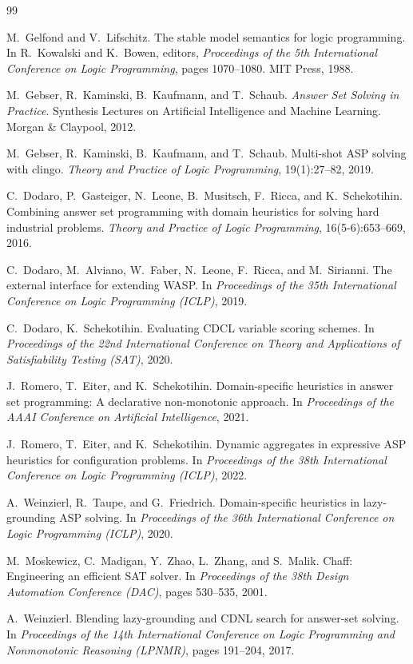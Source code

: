 \documentclass[a4paper,12pt,twoside,openright]{report}
\begin{document}
\begin{thebibliography}{99}

M.~Gelfond and V.~Lifschitz.
\newblock The stable model semantics for logic programming.
\newblock In R.~Kowalski and K.~Bowen, editors, \emph{Proceedings of the 5th International Conference on Logic Programming}, pages 1070--1080. MIT Press, 1988.

M.~Gebser, R.~Kaminski, B.~Kaufmann, and T.~Schaub.
\newblock \emph{Answer Set Solving in Practice}.
\newblock Synthesis Lectures on Artificial Intelligence and Machine Learning. Morgan \& Claypool, 2012.

M.~Gebser, R.~Kaminski, B.~Kaufmann, and T.~Schaub.
\newblock Multi-shot {ASP} solving with clingo.
\newblock \emph{Theory and Practice of Logic Programming}, 19(1):27--82, 2019.

C.~Dodaro, P.~Gasteiger, N.~Leone, B.~Musitsch, F.~Ricca, and K.~Schekotihin.
\newblock Combining answer set programming with domain heuristics for solving hard industrial problems.
\newblock \emph{Theory and Practice of Logic Programming}, 16(5-6):653--669, 2016.

C.~Dodaro, M.~Alviano, W.~Faber, N.~Leone, F.~Ricca, and M.~Sirianni.
\newblock The external interface for extending {WASP}.
\newblock In \emph{Proceedings of the 35th International Conference on Logic Programming (ICLP)}, 2019.

C.~Dodaro, K.~Schekotihin.
\newblock Evaluating {CDCL} variable scoring schemes.
\newblock In \emph{Proceedings of the 22nd International Conference on Theory and Applications of Satisfiability Testing (SAT)}, 2020.

J.~Romero, T.~Eiter, and K.~Schekotihin.
\newblock Domain-specific heuristics in answer set programming: A declarative non-monotonic approach.
\newblock In \emph{Proceedings of the AAAI Conference on Artificial Intelligence}, 2021.

J.~Romero, T.~Eiter, and K.~Schekotihin.
\newblock Dynamic aggregates in expressive {ASP} heuristics for configuration problems.
\newblock In \emph{Proceedings of the 38th International Conference on Logic Programming (ICLP)}, 2022.

A.~Weinzierl, R.~Taupe, and G.~Friedrich.
\newblock Domain-specific heuristics in lazy-grounding {ASP} solving.
\newblock In \emph{Proceedings of the 36th International Conference on Logic Programming (ICLP)}, 2020.

M.~Moskewicz, C.~Madigan, Y.~Zhao, L.~Zhang, and S.~Malik.
\newblock Chaff: Engineering an efficient {SAT} solver.
\newblock In \emph{Proceedings of the 38th Design Automation Conference (DAC)}, pages 530--535, 2001.

A.~Weinzierl.
\newblock Blending lazy-grounding and {CDNL} search for answer-set solving.
\newblock In \emph{Proceedings of the 14th International Conference on Logic Programming and Nonmonotonic Reasoning (LPNMR)}, pages 191--204, 2017.

\end{thebibliography}
\end{document}
